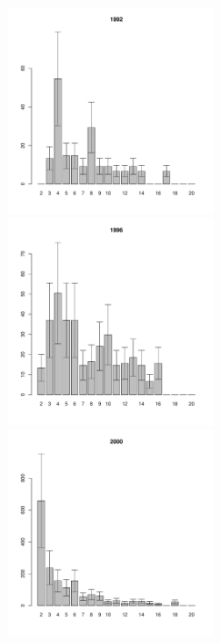 \documentclass[12pt, a4paper]{article}
\begin{document}
\newpage \begin{figure}[h] 

\begin{multicols}{3}
\hfill
\includegraphics[width=60mm]{../White_Sea/Luvenga_II_razrez/zostera_zone2_1992_.pdf}
\hfill
\includegraphics[width=60mm]{../White_Sea/Luvenga_II_razrez/zostera_zone2_1996_.pdf}
\hfill
\includegraphics[width=60mm]{../White_Sea/Luvenga_II_razrez/zostera_zone2_2000_.pdf}
\end{multicols}




\end{figure}
\end{document}
